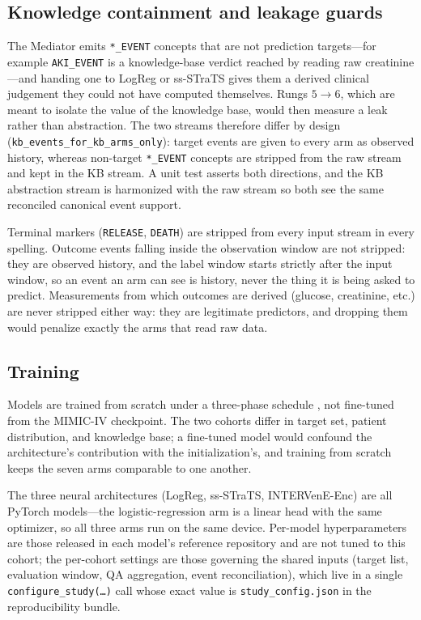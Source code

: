 \subsection{Knowledge containment and leakage guards}
\label{sec:methods-guards}

The Mediator emits \texttt{*\_EVENT} concepts that are not prediction
targets---for example \texttt{AKI\_EVENT} is a knowledge-base verdict
reached by reading raw creatinine---and handing one to LogReg or
ss-STraTS gives them a derived clinical judgement they could not have
computed themselves. Rungs $5 \to 6$, which are meant to isolate the
value of the knowledge base, would then measure a leak rather than
abstraction. The two streams therefore differ by design
(\texttt{kb\_events\_for\_kb\_arms\_only}):
target events are given to every arm as observed history, whereas
non-target \texttt{*\_EVENT} concepts are stripped from the raw stream
and kept in the KB stream. A unit test asserts both directions, and the
KB abstraction stream is harmonized with the raw stream so both see the
same reconciled canonical event support.

Terminal markers (\texttt{RELEASE}, \texttt{DEATH}) are stripped from
every input stream in every spelling. Outcome events falling inside the
observation window are not stripped: they are observed history, and the
label window starts strictly after the input window, so an event an arm
can see is history, never the thing it is being asked to predict.
Measurements from which outcomes are derived (glucose, creatinine,
etc.) are never stripped either way: they are legitimate predictors,
and dropping them would penalize exactly the arms that read raw data.

\subsection{Training}

Models are trained from scratch under a three-phase schedule
\citep{oded2027intervene}, not fine-tuned from the MIMIC-IV checkpoint.
The two cohorts differ in target set, patient distribution, and
knowledge base; a fine-tuned model would confound the architecture's
contribution with the initialization's, and training from scratch keeps
the seven arms comparable to one another.

The three neural architectures (LogReg, ss-STraTS, INTERVenE-Enc) are
all PyTorch models---the logistic-regression arm is a linear head with
the same optimizer, so all three arms run on the same device.
Per-model hyperparameters are those released in each model's reference
repository and are not tuned to this cohort; the per-cohort settings
are those governing the shared inputs (target list, evaluation window,
QA aggregation, event reconciliation), which live in a single
\texttt{configure\_study(\ldots)} call whose exact value is
\texttt{study\_config.json} in the reproducibility bundle.

